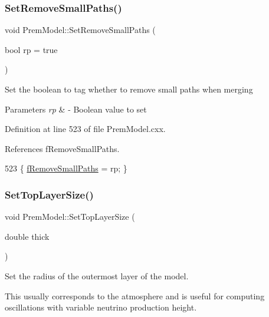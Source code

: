 \subsubsection{\texorpdfstring{Set\+Remove\+Small\+Paths()}{SetRemoveSmallPaths()}}
{\footnotesize\ttfamily void Prem\+Model\+::\+Set\+Remove\+Small\+Paths (\begin{DoxyParamCaption}\item[{bool}]{rp = {\ttfamily true} }\end{DoxyParamCaption})\hspace{0.3cm}{\ttfamily [virtual]}}

Set the boolean to tag whether to remove small paths when merging


\begin{DoxyParams}{Parameters}
{\em rp} & -\/ Boolean value to set \\
\hline
\end{DoxyParams}


Definition at line 523 of file Prem\+Model.\+cxx.



References f\+Remove\+Small\+Paths.


\begin{DoxyCode}
523 \{ \hyperlink{classOscProb_1_1PremModel_a3973df6f5f2ff219cd2f865b31aacfd2}{fRemoveSmallPaths} = rp; \}
\end{DoxyCode}
\mbox{\label{classOscProb_1_1PremModel_a095bd601f6cd91926de9928e96ea7751}} 
\subsubsection{\texorpdfstring{Set\+Top\+Layer\+Size()}{SetTopLayerSize()}}
{\footnotesize\ttfamily void Prem\+Model\+::\+Set\+Top\+Layer\+Size (\begin{DoxyParamCaption}\item[{double}]{thick }\end{DoxyParamCaption})\hspace{0.3cm}{\ttfamily [virtual]}}

Set the radius of the outermost layer of the model.

This usually corresponds to the atmosphere and is useful for computing oscillations with variable neutrino production height.


